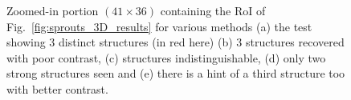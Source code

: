 \documentclass[journal]{IEEEtran}
\begin{document}
\begin{figure}[!h]
\centering
{}\hfill
{}\hfill
{}\hfill
{}\hfill
{}
\caption{Zoomed-in portion $(41 \times 36)$ containing the RoI of Fig.~\ref{fig:sprouts_3D_results} for various methods (a) the test showing 3 distinct structures (in red here) (b) 3 structures recovered with poor contrast, (c) structures indistinguishable, (d) only two strong structures seen and (e) there is a hint of a third structure too with better contrast.}
\label{fig:sprouts_zoomed_3D_results}
\end{figure}
\end{document}
